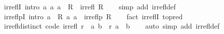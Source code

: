 \begin{isabellebody}
\isanewline
%
\endisadelimproof
\isanewline
{}\isamarkupfalse%
\ irreflI\ {\isacharbrackleft}{\kern0pt}intro{\isacharquery}{\kern0pt}{\isacharbrackright}{\kern0pt}{\isacharcolon}{\kern0pt}\ {\isachardoublequoteopen}{\isacharparenleft}{\kern0pt}{\isasymAnd}a{\isachardot}{\kern0pt}\ {\isacharparenleft}{\kern0pt}a{\isacharcomma}{\kern0pt}\ a{\isacharparenright}{\kern0pt}\ {\isasymnotin}\ R{\isacharparenright}{\kern0pt}\ {\isasymLongrightarrow}\ irrefl\ R{\isachardoublequoteclose}\isanewline
%
\isadelimproof
\ \ %
\endisadelimproof
%
\isatagproof
{}\isamarkupfalse%
\ {\isacharparenleft}{\kern0pt}simp\ add{\isacharcolon}{\kern0pt}\ irrefl{\isacharunderscore}{\kern0pt}def{\isacharparenright}{\kern0pt}%
\endisatagproof
{\isafoldproof}%
%
\isadelimproof
\isanewline
%
\endisadelimproof
\isanewline
{}\isamarkupfalse%
\ irreflpI\ {\isacharbrackleft}{\kern0pt}intro{\isacharquery}{\kern0pt}{\isacharbrackright}{\kern0pt}{\isacharcolon}{\kern0pt}\ {\isachardoublequoteopen}{\isacharparenleft}{\kern0pt}{\isasymAnd}a{\isachardot}{\kern0pt}\ {\isasymnot}\ R\ a\ a{\isacharparenright}{\kern0pt}\ {\isasymLongrightarrow}\ irreflp\ R{\isachardoublequoteclose}\isanewline
%
\isadelimproof
\ \ %
\endisadelimproof
%
\isatagproof
{}\isamarkupfalse%
\ {\isacharparenleft}{\kern0pt}fact\ irreflI\ {\isacharbrackleft}{\kern0pt}to{\isacharunderscore}{\kern0pt}pred{\isacharbrackright}{\kern0pt}{\isacharparenright}{\kern0pt}%
\endisatagproof
{\isafoldproof}%
%
\isadelimproof
\isanewline
%
\endisadelimproof
\isanewline
{}\isamarkupfalse%
\ irrefl{\isacharunderscore}{\kern0pt}distinct\ {\isacharbrackleft}{\kern0pt}code{\isacharbrackright}{\kern0pt}{\isacharcolon}{\kern0pt}\ {\isachardoublequoteopen}irrefl\ r\ {\isasymlongleftrightarrow}\ {\isacharparenleft}{\kern0pt}{\isasymforall}{\isacharparenleft}{\kern0pt}a{\isacharcomma}{\kern0pt}\ b{\isacharparenright}{\kern0pt}\ {\isasymin}\ r{\isachardot}{\kern0pt}\ a\ {\isasymnoteq}\ b{\isacharparenright}{\kern0pt}{\isachardoublequoteclose}\isanewline
%
\isadelimproof
\ \ %
\endisadelimproof
%
\isatagproof
{}\isamarkupfalse%
\ {\isacharparenleft}{\kern0pt}auto\ simp\ add{\isacharcolon}{\kern0pt}\ irrefl{\isacharunderscore}{\kern0pt}def{\isacharparenright}{\kern0pt}%
\endisatagproof
{\isafoldproof}%
%
\isadelimproof
%
\endisadelimproof
%
\isadelimdocument
%
\endisadelimdocument
%
\isatagdocument
%
\isamarkuptrue%
%
\endisatagdocument
{\isafolddocument}%
%
\isadelimdocument
%
\endisadelimdocument
{}\isamarkupfalse%

\end{isabellebody}
